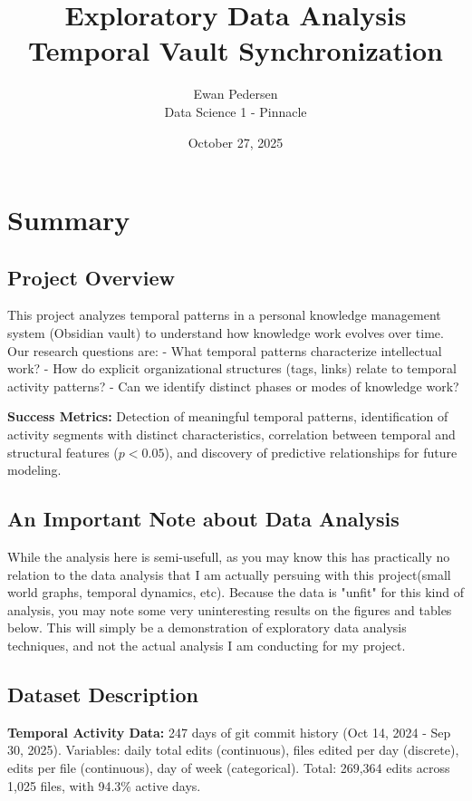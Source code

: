 \documentclass[11pt]{article}
\title{\textbf{Exploratory Data Analysis}\\
\large{Temporal Vault Synchronization}}
\author{Ewan Pedersen\\Data Science 1 - Pinnacle}
\date{October 27, 2025}
\begin{document}
\maketitle

\section{Summary}

\subsection{Project Overview}

This project analyzes temporal patterns in a personal knowledge management system (Obsidian vault) to understand how knowledge work evolves over time. Our research questions are:
- What temporal patterns characterize intellectual work? 
- How do explicit organizational structures (tags, links) relate to temporal activity patterns? 
- Can we identify distinct phases or modes of knowledge work?

\textbf{Success Metrics:} Detection of meaningful temporal patterns, identification of activity segments with distinct characteristics, correlation between temporal and structural features ($p < 0.05$), and discovery of predictive relationships for future modeling.

\subsection{An Important Note about Data Analysis}

While the analysis here is semi-usefull, as you may know this has practically no relation to the data analysis that I am actually persuing with this project(small world graphs, temporal dynamics, etc). Because the data is "unfit" for this kind of analysis, you may note some very uninteresting results on the figures and tables below. This will simply be a demonstration of exploratory data analysis techniques, and not the actual analysis I am conducting for my project.

\subsection{Dataset Description}

\textbf{Temporal Activity Data:} 247 days of git commit history (Oct 14, 2024 - Sep 30, 2025). Variables: daily total edits (continuous), files edited per day (discrete), edits per file (continuous), day of week (categorical). Total: 269,364 edits across 1,025 files, with 94.3\% active days.
\end{document}
